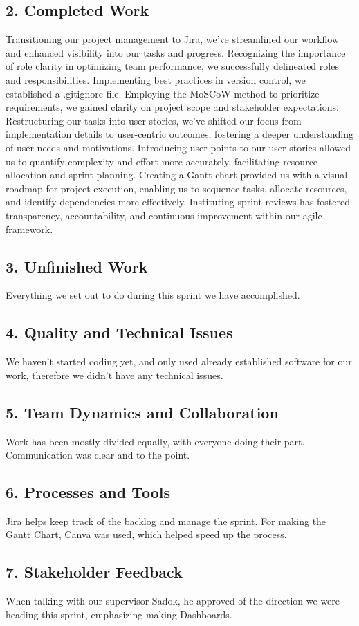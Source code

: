 \documentclass[12pt]{report}
\begin{document}
\subsection*{2. Completed Work}
Transitioning our project management to Jira, we've streamlined our workflow and enhanced visibility into our tasks and progress. Recognizing the importance of role clarity in optimizing team performance, we successfully delineated roles and responsibilities. Implementing best practices in version control, we established a .gitignore file. Employing the MoSCoW method to prioritize requirements, we gained clarity on project scope and stakeholder expectations. Restructuring our tasks into user stories, we've shifted our focus from implementation details to user-centric outcomes, fostering a deeper understanding of user needs and motivations. Introducing user points to our user stories allowed us to quantify complexity and effort more accurately, facilitating resource allocation and sprint planning. Creating a Gantt chart provided us with a visual roadmap for project execution, enabling us to sequence tasks, allocate resources, and identify dependencies more effectively. Instituting sprint reviews has fostered transparency, accountability, and continuous improvement within our agile framework.
\subsection*{3. Unfinished Work}
Everything we set out to do during this sprint we have accomplished.
\subsection*{4. Quality and Technical Issues}
We haven't started coding yet, and only used already established software for our work, therefore we didn't have any technical issues.
\subsection*{5. Team Dynamics and Collaboration}
Work has been mostly divided equally, with everyone doing their part. Communication was clear and to the point.
\subsection*{6. Processes and Tools}
Jira helps keep track of the backlog and manage the sprint. For making the Gantt Chart, Canva was used, which helped speed up the process.
\subsection*{7. Stakeholder Feedback}
When talking with our supervisor Sadok, he approved of the direction we were heading this sprint, emphasizing making Dashboards.
\end{document}
